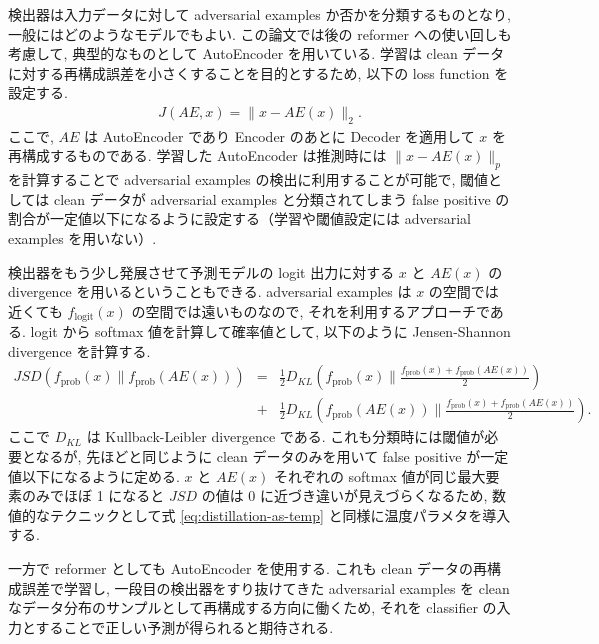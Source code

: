検出器は入力データに対して adversarial examples か否かを分類するものとなり, 一般にはどのようなモデルでもよい.
この論文では後の reformer への使い回しも考慮して, 典型的なものとして AutoEncoder を用いている.
学習は clean データに対する再構成誤差を小さくすることを目的とするため, 以下の loss function を設定する.
%
\begin{eqnarray}
J(AE, x) = \| x - AE(x) \|_2.
\label{eq:magnet-ae-train}
\end{eqnarray}
%
ここで, $AE$ は AutoEncoder であり Encoder のあとに Decoder を適用して $x$ を再構成するものである.
学習した AutoEncoder は推測時には $\|x - AE(x)\|_p$ を計算することで adversarial examples の検出に利用することが可能で, 閾値としては clean データが adversarial examples と分類されてしまう false positive の割合が一定値以下になるように設定する（学習や閾値設定には adversarial examples を用いない）.

検出器をもう少し発展させて予測モデルの logit 出力に対する $x$ と $AE(x)$ の divergence を用いるということもできる.
adversarial examples は $x$ の空間では近くても $f_{\text{logit}} (x)$ の空間では遠いものなので, それを利用するアプローチである.
logit から softmax 値を計算して確率値として, 以下のように Jensen-Shannon divergence を計算する.
%
\begin{eqnarray}
JSD(f_{\text{prob}} (x)\|f_{\text{prob}} (AE(x))) &=& \frac{1}{2} D_{KL} \left(f_{\text{prob}} (x) \| \frac{f_{\text{prob}} (x) + f_{\text{prob}} (AE(x)) }{2} \right) \nonumber \\
&+& \frac{1}{2} D_{KL} \left(f_{\text{prob}} (AE(x)) \| \frac{f_{\text{prob}} (x) + f_{\text{prob}} (AE(x)) }{2} \right).
\label{eq:magnet-jsd-ae}
\end{eqnarray}
%
ここで $D_{KL}$ は Kullback-Leibler divergence である.
これも分類時には閾値が必要となるが, 先ほどと同じように clean データのみを用いて false positive が一定値以下になるように定める.
$x$ と $AE(x)$ それぞれの softmax 値が同じ最大要素のみでほぼ 1 になると $JSD$ の値は 0 に近づき違いが見えづらくなるため, 数値的なテクニックとして式 \ref{eq:distillation-as-temp} と同様に温度パラメタを導入する.

一方で reformer としても AutoEncoder を使用する.
これも clean データの再構成誤差で学習し, 一段目の検出器をすり抜けてきた adversarial examples を clean なデータ分布のサンプルとして再構成する方向に働くため, それを classifier の入力とすることで正しい予測が得られると期待される.

